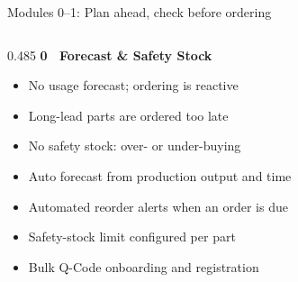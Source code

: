 \begin{frame}{Modules 0–1: Plan ahead, check before ordering}
    \vspace{0.15cm}
    
    \begin{columns}[T]
        \begin{column}{0.485\textwidth}
            {\fontsize{9.5}{12}\bfseries\selectfont\color{primary}0 \textbullet\ Forecast \& Safety Stock}\par
            \vspace{0.2cm}
            
            \begin{beforebox}
                {\fontsize{7.8}{10.5}\selectfont\color{darkslate}
                \begin{itemize}\setlength{\itemsep}{2pt}\setlength{\leftmargin}{10pt}
                    \item[\textcolor{problemtext}{\textbullet}] No usage forecast; ordering is reactive
                    \item[\textcolor{problemtext}{\textbullet}] Long-lead parts are ordered too late
                    \item[\textcolor{problemtext}{\textbullet}] No safety stock: over- or under-buying
                \end{itemize}
                }
            \end{beforebox}
            
            \vspace{0.15cm}
            
            \begin{afterbox}
                {\fontsize{7.8}{10.5}\selectfont\color{darkslate}
                \begin{itemize}\setlength{\itemsep}{2pt}\setlength{\leftmargin}{10pt}
                    \item[\textcolor{primary}{\textbullet}] Auto forecast from production output and time
                    \item[\textcolor{primary}{\textbullet}] Automated reorder alerts when an order is due
                    \item[\textcolor{primary}{\textbullet}] Safety-stock limit configured per part
                    \item[\textcolor{primary}{\textbullet}] Bulk Q-Code onboarding and registration
                \end{itemize}
                }
            \end{afterbox}
        \end{column}
        

\end{columns}
\end{frame}
